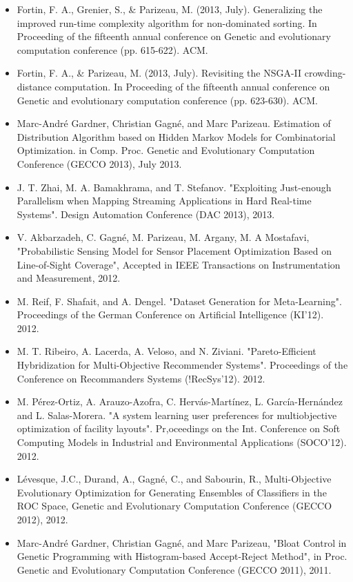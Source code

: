 \documentclass{article}
\begin{document}
\begin{itemize}
   \item  Fortin, F. A., Grenier, S., \& Parizeau, M. (2013, July). Generalizing the improved run-time complexity algorithm for non-dominated sorting. In Proceeding of the fifteenth annual conference on Genetic and evolutionary computation conference (pp. 615-622). ACM.
   \item  Fortin, F. A., \& Parizeau, M. (2013, July). Revisiting the NSGA-II crowding-distance computation. In Proceeding of the fifteenth annual conference on Genetic and evolutionary computation conference (pp. 623-630). ACM.
   \item  Marc-André Gardner, Christian Gagné, and Marc Parizeau. Estimation of Distribution Algorithm based on Hidden Markov Models for Combinatorial Optimization. in Comp. Proc. Genetic and Evolutionary Computation Conference (GECCO 2013), July 2013.
   \item  J. T. Zhai, M. A. Bamakhrama, and T. Stefanov. "Exploiting Just-enough Parallelism when Mapping Streaming Applications in Hard Real-time Systems". Design Automation Conference (DAC 2013), 2013.
   \item  V. Akbarzadeh, C. Gagné, M. Parizeau, M. Argany, M. A Mostafavi, "Probabilistic Sensing Model for Sensor Placement Optimization Based on Line-of-Sight Coverage", Accepted in IEEE Transactions on Instrumentation and Measurement, 2012.
  \item   M. Reif, F. Shafait, and A. Dengel. "Dataset Generation for Meta-Learning". Proceedings of the German Conference on Artificial Intelligence (KI'12). 2012.
   \item  M. T. Ribeiro, A. Lacerda, A. Veloso, and N. Ziviani. "Pareto-Efficient Hybridization for Multi-Objective Recommender Systems". Proceedings of the Conference on Recommanders Systems (!RecSys'12). 2012.
  \item   M. Pérez-Ortiz, A. Arauzo-Azofra, C. Hervás-Martínez, L. García-Hernández and L. Salas-Morera. "A system learning user preferences for multiobjective optimization of facility layouts". Pr,oceedings on the Int. Conference on Soft Computing Models in Industrial and Environmental Applications (SOCO'12). 2012.
 \item    Lévesque, J.C., Durand, A., Gagné, C., and Sabourin, R., Multi-Objective Evolutionary Optimization for Generating Ensembles of Classifiers in the ROC Space, Genetic and Evolutionary Computation Conference (GECCO 2012), 2012.
 \item    Marc-André Gardner, Christian Gagné, and Marc Parizeau, "Bloat Control in Genetic Programming with Histogram-based Accept-Reject Method", in Proc. Genetic and Evolutionary Computation Conference (GECCO 2011), 2011.

\end{itemize}
\end{document}
